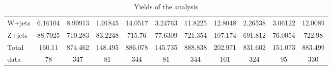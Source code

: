 \documentclass[10pt]{article}
\begin{document}
\begin{table}[htbp]
\begin{center}
\begin{tabular}{|l|S|S|S|S|S|S|S|S|S|S|}
  W+jets   & 6.16104  & 8.90913  & 1.01845  & 14.0517  & 3.24763  & 11.8225  & 12.8048  & 2.26538  & 3.06122  & 12.0089  \\ 
  Z+jets   & 88.7025  & 710.283  & 83.2248  & 715.76  & 77.6309  & 721.354  & 107.174  & 691.812  & 76.0054  & 722.98  \\ 
\hline 
  Total  & 160.11  & 874.462  & 148.495  & 886.078  & 145.735  & 888.838  & 202.971  & 831.602  & 151.073  & 883.499  \\ 
\hline 
  data   & 78 & 347 & 81 & 344 & 81 & 344 & 101 & 324 & 95 & 330 \\ 
\hline 
\end{tabular} 
\caption{Yields of the analysis} 
\end{center} 
\end{table} 
\end{document}
